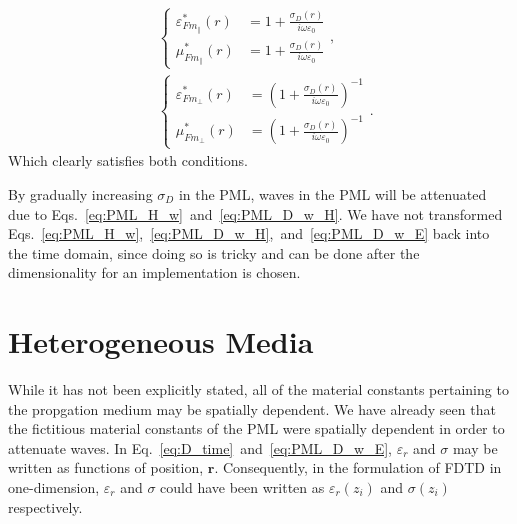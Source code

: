 \documentclass[12pt]{article}
\begin{document}
\begin{multicols}{2}
\begin{subequations}
\begin{align}
&\left\{
\begin{aligned}
\varepsilon_{Fm_\parallel}^*(r)&=1+\frac{\sigma_{D}(r)}{i\omega\varepsilon_0}\\
\mu_{Fm_\parallel}^*(r)&=1+\frac{\sigma_{D}(r)}{i\omega\varepsilon_0}
\end{aligned}\right.,\\
&\left\{
\begin{aligned}
\varepsilon_{Fm_\perp}^*(r)&=\left(1+\frac{\sigma_{D}(r)}{i\omega\varepsilon_0}\right)^{-1}\\
\mu_{Fm_\perp}^*(r)&=\left(1+\frac{\sigma_{D}(r)}{i\omega\varepsilon_0}\right)^{-1}
\end{aligned}\right..
\end{align}
\end{subequations}
Which clearly satisfies both conditions.

By gradually increasing $\sigma_{D}$ in the PML, waves in the PML will be attenuated due to Eqs.~\ref{eq:PML_H_w}~and~\ref{eq:PML_D_w_H}. We have not transformed Eqs.~\ref{eq:PML_H_w},~\ref{eq:PML_D_w_H},~and~\ref{eq:PML_D_w_E} back into the time domain, since doing so is tricky and can be done after the dimensionality for an implementation is chosen.

\section{Heterogeneous Media}
While it has not been explicitly stated, all of the material constants pertaining to the propgation medium may be spatially dependent. We have already seen that the fictitious material constants of the PML were spatially dependent in order to attenuate waves. In Eq.~\ref{eq:D_time}~and~\ref{eq:PML_D_w_E}, $\varepsilon_r$ and $\sigma$ may be written as functions of position, $\mathbf{r}$. Consequently, in the formulation of FDTD in one-dimension, $\varepsilon_r$ and $\sigma$ could have been written as $\varepsilon_r(z_i)$ and $\sigma(z_i)$ respectively.


\end{multicols}
\end{document}
